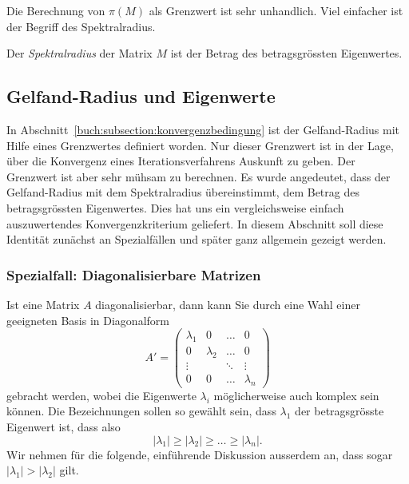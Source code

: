 Die Berechnung von $\pi(M)$ als Grenzwert ist sehr unhandlich.
Viel einfacher ist der Begriff des Spektralradius.
%

\begin{definition}
\label{buch:definition:spektralradius}
Der {\em Spektralradius} der Matrix $M$ ist der Betrag des betragsgrössten
Eigenwertes.
\end{definition}

%
%
\subsection{Gelfand-Radius und Eigenwerte
\label{buch:subsection:spektralradius}}
In Abschnitt~\ref{buch:subsection:konvergenzbedingung}
ist der Gelfand-Radius mit Hilfe eines Grenzwertes definiert worden.
%
Nur dieser Grenzwert ist in der Lage, über die Konvergenz eines 
Iterationsverfahrens Auskunft zu geben.
Der Grenzwert ist aber sehr mühsam zu berechnen.
%
Es wurde angedeutet, dass der Gelfand-Radius mit dem Spektralradius
übereinstimmt, dem Betrag des  betragsgrössten Eigenwertes.
Dies hat uns ein vergleichsweise einfach auszuwertendes Konvergenzkriterium
geliefert.
%
In diesem Abschnitt soll diese Identität zunächst an Spezialfällen
und später ganz allgemein gezeigt werden.

\subsubsection{Spezialfall: Diagonalisierbare Matrizen}
Ist eine Matrix $A$ diagonalisierbar, dann kann Sie durch eine Wahl
einer geeigneten Basis in Diagonalform
%
%
\[
A'
=
\begin{pmatrix}
\lambda_1&        0&\dots &0\\
0        &\lambda_2&\dots &0\\
\vdots   &         &\ddots&\vdots\\
0        &        0&\dots &\lambda_n
\end{pmatrix}
\]
gebracht werden, wobei die Eigenwerte $\lambda_i$  möglicherweise auch
komplex sein können.
%
Die Bezeichnungen sollen so gewählt sein, dass $\lambda_1$ der
betragsgrösste Eigenwert ist, dass also
\[
|\lambda_1| \ge |\lambda_2| \ge \dots \ge |\lambda_n|.
\]
Wir nehmen für die folgende, einführende Diskussion ausserdem an, dass
sogar $|\lambda_1|>|\lambda_2|$ gilt.

